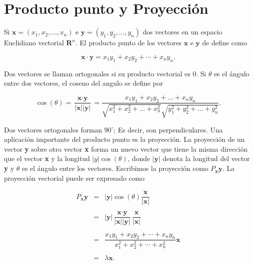 \section{Producto punto y Proyección}

Si $\textbf{x}=(x_1,x_2,\ldots,x_n)$ e $\textbf{y}=(y_1,y_2,\ldots, y_n)$ dos vectores en un espacio Euclidiano vectorial $\textbf{R}^n$. El producto punto de los vectores $\textbf{x}$ e $\textbf{y}$ de define como

$$\textbf{x}\cdot \textbf{y} = x_1y_1+x_2y_2+\cdots + x_ny_n.$$

Dos vectores se llaman ortogonales si su  producto vectorial es $0$. Si $\theta$ es el ángulo entre dos vectores, el coseno del angulo se define por

\begin{tcolorbox}
    \begin{equation}
	\cos(\theta)=\dfrac{\textbf{x}\cdot \textbf{y}}{|\textbf{x}||\textbf{y}|}=\dfrac{x_1y_1+x_2y_2+\ldots  +x_ny_n}{\sqrt{x_1^2+x_2^2+\ldots + x_n^2}\sqrt{y_1^2+y_2^2+\ldots + y_n^2}}.
    \end{equation}
\end{tcolorbox}

Dos vectores ortogonales forman $90^\circ$; Es decir, son perpendiculares. Una aplicación importante del producto punto es la proyección. La proyección de un vector \textbf{y} sobre otro vector \textbf{x} forma un nuevo vector que tiene la misma dirección que el vector \textbf{x} y la longitud $|y|\cos(\theta)$, donde $|\textbf{y}|$ denota la longitud del vector \textbf{y} y $\theta$ es el ángulo entre los vectores. Escribimos la proyección como $P_{\textbf{x}}\textbf{y}$. La proyección vectorial puede ser expresado como

$$
\begin{array}{rcl}
    P_{\textbf{x}}\textbf{y} &=& |\textbf{y}|\cos(\theta)\dfrac{\textbf{x}}{|\textbf{x}|}\\\\
			     &=& |\textbf{y}|\dfrac{\textbf{x}\cdot \textbf{y}}{|\textbf{x}||\textbf{y}|}\dfrac{\textbf{x}}{|\textbf{x}|} \\\\
			     &=& \dfrac{x_1y_1+x_2y_2+\cdots + x_ny_n}{x_1^2+x_2^2+\cdots + x_n^2}\textbf{x}\\\\
			     &=& \lambda \textbf{x}.\\\\
\end{array}
$$

